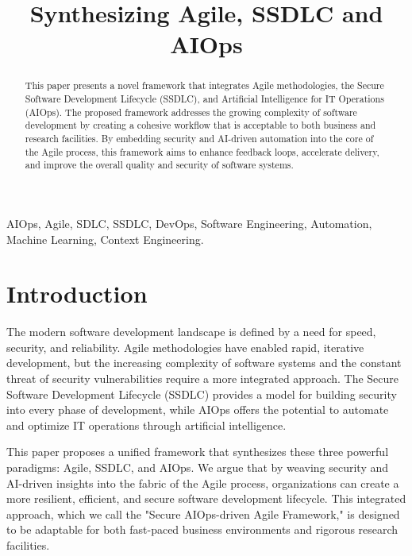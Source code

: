 \documentclass[journal]{IEEEtran}
\begin{document}
\title{Synthesizing Agile, SSDLC and AIOps}



\maketitle

\begin{abstract}
This paper presents a novel framework that integrates Agile methodologies, the Secure Software Development Lifecycle (SSDLC), and Artificial Intelligence for IT Operations (AIOps). The proposed framework addresses the growing complexity of software development by creating a cohesive workflow that is acceptable to both business and research facilities. By embedding security and AI-driven automation into the core of the Agile process, this framework aims to enhance feedback loops, accelerate delivery, and improve the overall quality and security of software systems.
\end{abstract}

\begin{IEEEkeywords}
AIOps, Agile, SDLC, SSDLC, DevOps, Software Engineering, Automation, Machine Learning, Context Engineering.
\end{IEEEkeywords}

\section{Introduction}
The modern software development landscape is defined by a need for speed, security, and reliability. Agile methodologies have enabled rapid, iterative development, but the increasing complexity of software systems and the constant threat of security vulnerabilities require a more integrated approach. The Secure Software Development Lifecycle (SSDLC) provides a model for building security into every phase of development, while AIOps offers the potential to automate and optimize IT operations through artificial intelligence.

This paper proposes a unified framework that synthesizes these three powerful paradigms: Agile, SSDLC, and AIOps. We argue that by weaving security and AI-driven insights into the fabric of the Agile process, organizations can create a more resilient, efficient, and secure software development lifecycle. This integrated approach, which we call the "Secure AIOps-driven Agile Framework," is designed to be adaptable for both fast-paced business environments and rigorous research facilities.
\end{document}
